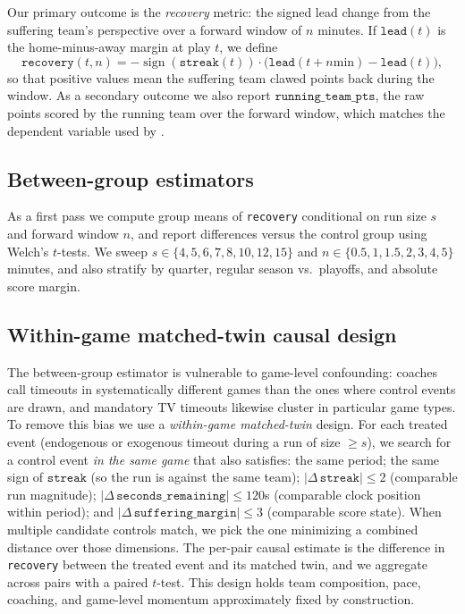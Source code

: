 \documentclass[twoside,11pt]{article}
\begin{document}
Our primary outcome is the \emph{recovery} metric: the signed lead change from the suffering team's
perspective over a forward window of $n$ minutes. If $\texttt{lead}(t)$ is the home-minus-away margin at play
$t$, we define
\[
		\texttt{recovery}(t, n) = -\operatorname{sign}(\texttt{streak}(t)) \cdot \bigl(\texttt{lead}(t + n\text{
		min}) - \texttt{lead}(t)\bigr),
\]
so that positive values mean the suffering team clawed points back during the window. As a secondary outcome
we also report $\texttt{running\_team\_pts}$, the raw points scored by the running team over the forward
window, which matches the dependent variable used by \citet{weimer2023causal}.

\subsection{Between-group estimators}

As a first pass we compute group means of \texttt{recovery} conditional on run size $s$ and forward window
$n$, and report differences versus the control group using Welch's $t$-tests. We sweep $s \in \{4, 5, 6, 7,
8, 10, 12, 15\}$ and $n \in \{0.5, 1, 1.5, 2, 3, 4, 5\}$ minutes, and also stratify by quarter, regular season
vs.\ playoffs, and absolute score margin.

\subsection{Within-game matched-twin causal design}

The between-group estimator is vulnerable to game-level confounding: coaches call timeouts in systematically
different games than the ones where control events are drawn, and mandatory TV timeouts likewise cluster in
particular game types. To remove this bias we use a \emph{within-game matched-twin} design. For each treated
event (endogenous or exogenous timeout during a run of size $\geq s$), we search for a control event \emph{in
the same game} that also satisfies: the same period; the same sign of $\texttt{streak}$ (so the run is against
the same team); $|\Delta\,\texttt{streak}| \leq 2$ (comparable run magnitude); $|\Delta\,\texttt{seconds\_remaining}|
\leq 120$s (comparable clock position within period); and $|\Delta\,\texttt{suffering\_margin}| \leq 3$
(comparable score state). When multiple candidate controls match, we pick the one minimizing a combined
distance over those dimensions. The per-pair causal estimate is the difference in \texttt{recovery} between
the treated event and its matched twin, and we aggregate across pairs with a paired $t$-test. This design
holds team composition, pace, coaching, and game-level momentum approximately fixed by construction.
\end{document}
